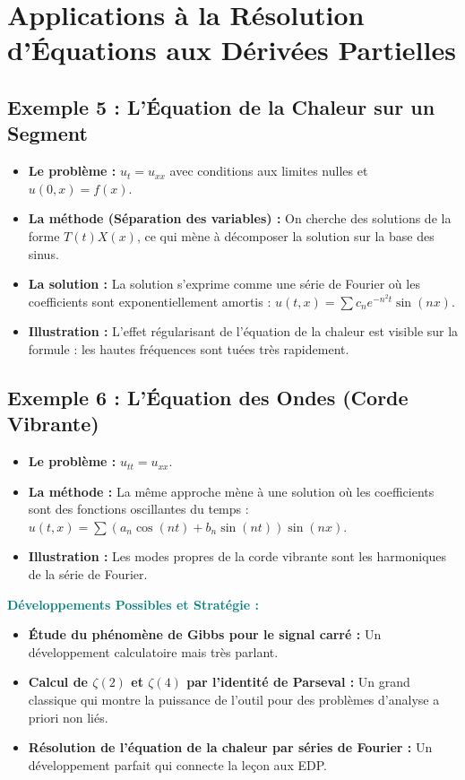 \documentclass[12pt, a4paper, parskip=full]{report}
\theoremstyle{agregstyle}
\newenvironment{developpements}
  {\par\medskip\noindent\begin{oframed}\noindent\textbf{\textcolor{teal}{Développements Possibles et Stratégie :}}}
  {\end{oframed}\par\medskip}
\begin{document}
\section{Applications à la Résolution d'Équations aux Dérivées Partielles}
\subsection{Exemple 5 : L'Équation de la Chaleur sur un Segment}
\begin{itemize}
    \item \textbf{Le problème :} $u_t = u_{xx}$ avec conditions aux limites nulles et $u(0,x)=f(x)$.
    \item \textbf{La méthode (Séparation des variables) :} On cherche des solutions de la forme $T(t)X(x)$, ce qui mène à décomposer la solution sur la base des sinus.
    \item \textbf{La solution :} La solution s'exprime comme une série de Fourier où les coefficients sont exponentiellement amortis : $u(t,x) = \sum c_n e^{-n^2 t} \sin(nx)$.
    \item \textbf{Illustration :} L'effet régularisant de l'équation de la chaleur est visible sur la formule : les hautes fréquences sont tuées très rapidement.
\end{itemize}
\subsection{Exemple 6 : L'Équation des Ondes (Corde Vibrante)}
\begin{itemize}
    \item \textbf{Le problème :} $u_{tt} = u_{xx}$.
    \item \textbf{La méthode :} La même approche mène à une solution où les coefficients sont des fonctions oscillantes du temps : $u(t,x) = \sum (a_n \cos(nt) + b_n \sin(nt))\sin(nx)$.
    \item \textbf{Illustration :} Les modes propres de la corde vibrante sont les harmoniques de la série de Fourier.
\end{itemize}

\begin{developpements}
    \begin{itemize}
        \item \textbf{Étude du phénomène de Gibbs pour le signal carré :} Un développement calculatoire mais très parlant.
        \item \textbf{Calcul de $\zeta(2)$ et $\zeta(4)$ par l'identité de Parseval :} Un grand classique qui montre la puissance de l'outil pour des problèmes d'analyse a priori non liés.
        \item \textbf{Résolution de l'équation de la chaleur par séries de Fourier :} Un développement parfait qui connecte la leçon aux EDP.
    \end{itemize}
\end{developpements}
\end{document}
